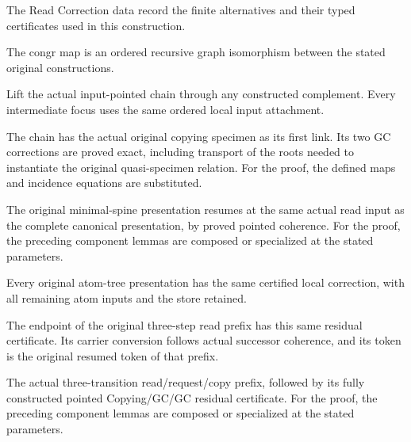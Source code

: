 The Read Correction data record the finite alternatives and their typed certificates used in this construction.
\par{}

The congr map is an ordered recursive graph isomorphism between the stated original constructions.
\par{}

Lift the actual input-pointed chain through any constructed complement. Every intermediate focus uses the same ordered local input attachment.
\par{}

The chain has the actual original copying specimen as its first link. Its two GC corrections are proved exact, including transport of the roots needed to instantiate the original quasi-specimen relation.
For the proof, the defined maps and incidence equations are substituted.
\par{}

The original minimal-spine presentation resumes at the same actual read input as the complete canonical presentation, by proved pointed coherence.
For the proof, the preceding component lemmas are composed or specialized at the stated parameters.
\par{}

Every original atom-tree presentation has the same certified local correction, with all remaining atom inputs and the store retained.
\par{}

The endpoint of the original three-step read prefix has this same residual certificate. Its carrier conversion follows actual successor coherence, and its token is the original resumed token of that prefix.
\par{}

The actual three-transition read/request/copy prefix, followed by its fully constructed pointed Copying/GC/GC residual certificate.
For the proof, the preceding component lemmas are composed or specialized at the stated parameters.
\par{}

